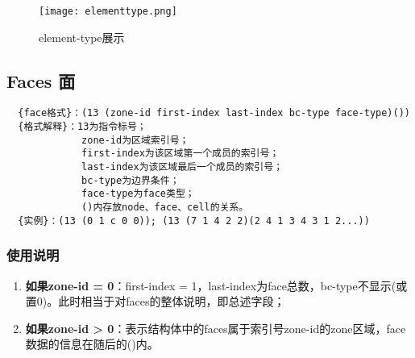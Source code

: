 \documentclass[lang=cn,11pt,a4paper]{elegantpaper} %
\begin{document}
\begin{figure}[!htb]
  \centering
  \texttt{[image: elementtype.png]}
  \caption{element-type展示}
  \label{elementtype}
\end{figure}

\subsection{Faces 面}\label{Faces}
\begin{lstlisting}
  {face格式}：(13 (zone-id first-index last-index bc-type face-type)())
  {格式解释}：13为指令标号；
             zone-id为区域索引号；
             first-index为该区域第一个成员的索引号；
             last-index为该区域最后一个成员的索引号；
             bc-type为边界条件；
             face-type为face类型；
             ()内存放node、face、cell的关系。
  {实例}：(13 (0 1 c 0 0)); (13 (7 1 4 2 2)(2 4 1 3 4 3 1 2...))
\end{lstlisting}

\subsubsection{使用说明}
\begin{enumerate}
  \item \textbf{如果zone-id = 0}：first-index = 1，last-index为face总数，bc-type不显示(或置0)。此时相当于对faces的整体说明，即总述字段；
  \item \textbf{如果zone-id > 0}：表示结构体中的faces属于索引号zone-id的zone区域，face数据的信息在随后的()内。
\end{enumerate}
\end{document}
